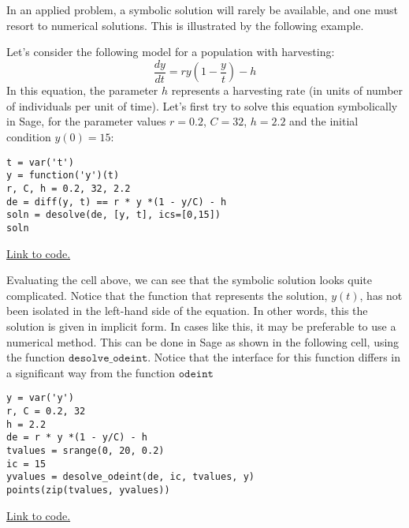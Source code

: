 \documentclass{ximera}
\begin{document}




In an applied problem, a symbolic solution will rarely be available, and one must resort to numerical solutions. This is illustrated by the following example.

\begin{example}
    
Let's consider the following model for a population with harvesting:
\[
\frac{dy}{dt}=ry\left(1-\frac{y}{t}\right)-h
\]
In this equation, the parameter $h$ represents a harvesting rate (in units of number of individuals per unit of time). Let's first try to solve this equation symbolically in Sage, for the parameter values $r=0.2$, $C=32$, $h=2.2$ and  the initial condition $y(0)=15$:

\begin{verbatim}
t = var('t')
y = function('y')(t)
r, C, h = 0.2, 32, 2.2
de = diff(y, t) == r * y *(1 - y/C) - h
soln = desolve(de, [y, t], ics=[0,15])
soln
\end{verbatim}

\href{https://sagecell.sagemath.org/?z=eJwlS0sKwyAU3AveYXZqeE0TS5aucoyQRYlKhGLA2IC37wtdDPOvcLjeRauqjBSNXfzmraYja9WU0ZXTQpgJO3dDbwkvhu2tFD5w5FOMuhGqgXMo6NDQ6REPtOdsmHYpzuOT72lgcQXtA2G5LyshbadbBhqn1fx3P1TbJTw=&lang=sage&interacts=eJyLjgUAARUAuQ==}{Link to code.}

Evaluating the cell above, we can see that the symbolic solution looks quite complicated. Notice that the function that represents the solution, $y(t)$, has not been isolated in the left-hand side of the equation. In other words, this the solution is given in implicit form. In cases like this, it may be preferable to use a numerical method. This can be done in Sage as shown in the following cell, using the function $\mathtt{desolve\_odeint}$. Notice that the interface for this function differs in a significant way from the function $\mathtt{odeint}$

\begin{verbatim}
y = var('y')
r, C = 0.2, 32
h = 2.2
de = r * y *(1 - y/C) - h
tvalues = srange(0, 20, 0.2)
ic = 15
yvalues = desolve_odeint(de, ic, tvalues, y)
points(zip(tvalues, yvalues))
\end{verbatim}

\href{https://sagecell.sagemath.org/?z=eJxFjMEKwjAQRO-B_MPcmpS1thGPnvohEprFBkpbkhqIX--CoodlZ-ftTMUNxSfT1MZqlQijGH3nCBen1SyH60QEFpXQoqI1A06o59HKmrU6il-enIXn5NcHm57gZKREGuMkYLhqVX9vgfO2FL5vgeN6mMCEOBG-PYQqsX0TlM0r7ubvf4S1b7WlMgo=&lang=sage&interacts=eJyLjgUAARUAuQ==}{Link to code.}
\end{example}
\end{document}
